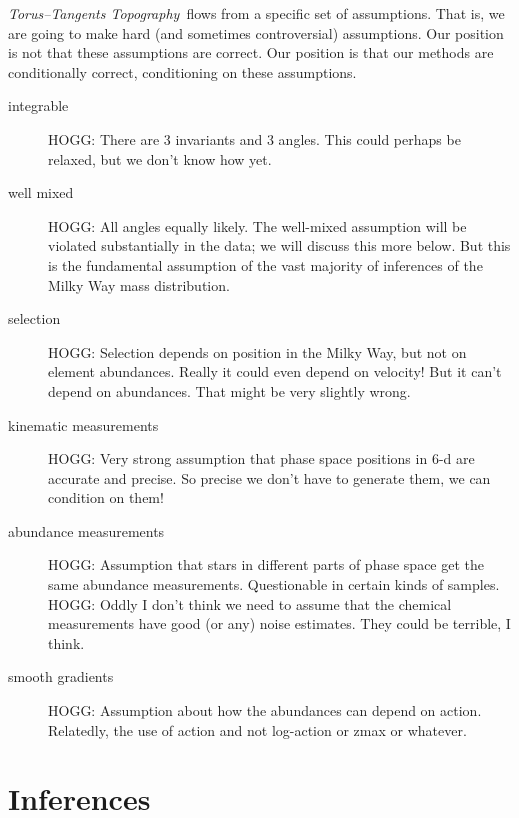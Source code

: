 \documentclass[modern]{aastex63}
\newcommand{\methodname}{\textsl{Torus--Tangents Topography}}
\begin{document}
\methodname\ flows from a specific set of assumptions.
That is, we are going to make hard (and sometimes controversial) assumptions.
Our position is not that these assumptions are correct.
Our position is that our
methods are conditionally correct, conditioning on these assumptions.
\begin{description}
\item[integrable] HOGG: There are 3 invariants and 3 angles. This could perhaps be
  relaxed, but we don't know how yet.

\item[well mixed] HOGG: All angles equally likely.
  The well-mixed assumption will be violated substantially in the data;
  we will discuss this more below. But this is the fundamental assumption of
  the vast majority of inferences of the Milky Way mass distribution.

\item[selection] HOGG: Selection depends on position in the Milky Way, but not
  on element abundances. Really it could even depend on velocity! But it can't depend
  on abundances. That might be very slightly wrong.

\item[kinematic measurements] HOGG: Very strong assumption that phase space positions
  in 6-d are accurate and precise. So precise we don't have to generate them, we can
  condition on them!

\item[abundance measurements] HOGG: Assumption that stars in different parts of phase
  space get the same abundance measurements. Questionable in certain kinds of samples.
  HOGG: Oddly I don't think we need to assume that the chemical measurements have good
  (or any) noise estimates. They could be terrible, I think.

\item[smooth gradients] HOGG: Assumption about how the abundances can
  depend on action. Relatedly, the use of action and not log-action
  or zmax or whatever.
\end{description}

\section{Inferences}
\end{document}
